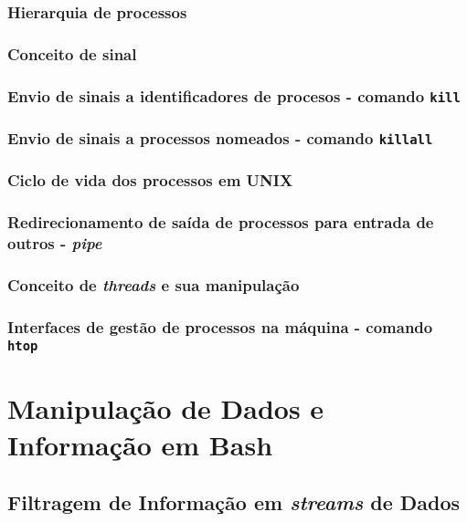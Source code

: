 \documentclass[a4paper, onecolumn, 10pt]{report}
\begin{document}
\subsection{Hierarquia de processos}

\subsection{Conceito de sinal}

\subsection{Envio de sinais a identificadores de procesos - comando \texttt{kill}}

\subsection{Envio de sinais a processos nomeados - comando \texttt{killall}}

\subsection{Ciclo de vida dos processos em UNIX}

\subsection{Redirecionamento de saída de processos para entrada de outros - \textit{pipe}}

\subsection{Conceito de \textit{threads} e sua manipulação}

\subsection{Interfaces de gestão de processos na máquina - comando \texttt{htop}}

\chapter{Manipulação de Dados e Informação em Bash}

\section{Filtragem de Informação em \textit{streams} de Dados}
\end{document}
